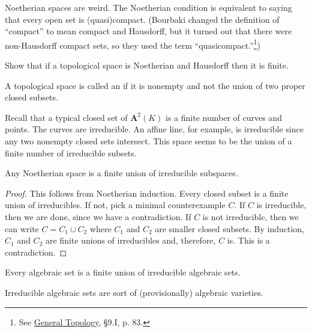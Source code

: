 \documentclass [11 pt, oneside, margin = 1 in] {article}
\begin{document}
Noetherian spaces are weird. The Noetherian condition is equivalent to saying that every open set is (quasi)compact. (Bourbaki changed the definition of ``compact'' to mean compact and Hausdorff, but it turned out that there were non-Hausdorff compact sets, so they used the term ``quasicompact.''\footnote{See \underline{General Topology}, \S 9.I, p. 83.}) 

\begin{exercise}\label{}\text{}
Show that if a topological space is Noetherian and Hausdorff then it is finite.
\end{exercise}

\begin{definition}[ ]\label{}\text{}
A topological space is called an  if it is nonempty and not the union of two proper closed subsets.
\end{definition}

Recall that a typical closed set of $\mathbf{A}^2(K)$ is a finite number of curves and points. The curves are irreducible. An affine line, for example, is irreducible since any two nonempty closed sets intersect. This space seems to be the union of a finite number of irreducible subsets.

\begin{theorem}[ ]\label{}\index{}\text{}
Any Noetherian space is a finite union of irreducible subspaces.
\end{theorem}

\begin{proof}
This follows from Noetherian induction. Every closed subset is a finite union of irreducibles. If not, pick a minimal counterexample $C$. If $C$ is irreducible, then we are done, since we have a contradiction. If $C$ is not irreducible, then we can write $C=C_1\cup C_2$ where $C_1$ and $C_2$ are smaller closed subsets. By induction, $C_1$ and $C_2$ are finite unions of irreducibles and, therefore, $C$ is. This is a contradiction. 
\end{proof}

\begin{corollary}[ ]\label{}\text{}
Every algebraic set is a finite union of irreducible algebraic sets.
\end{corollary}

\begin{remark}
	Irreducible algebraic sets are sort of (provisionally) algebraic varieties.
\end{remark}
\end{document}
